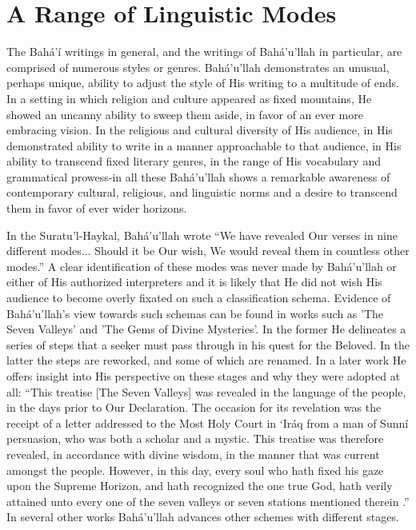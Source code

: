 \documentclass[12pt, oneside]{report}
\begin{document}
\section{A Range of Linguistic Modes}
\par
The Bah\'{a}'\'{i} writings in general, and the writings of Bah\'{a}'u'llah in particular, are comprised of numerous styles or genres. Bah\'{a}'u'llah demonstrates an unusual, perhaps unique, ability to adjust the style of His writing to a multitude of ends.
In a setting in which religion and culture appeared as fixed mountains, He showed an uncanny ability to sweep them aside, in favor of an ever more embracing vision.
In the religious and cultural diversity of His audience, in His demonstrated ability to write in a manner approachable to that audience, in His ability to transcend fixed literary genres, in the range of His vocabulary and grammatical prowess-in all these Bah\'{a}'u'llah shows a remarkable awareness of contemporary cultural, religious, and linguistic norms and a desire to transcend them in favor of ever wider horizons.
\par
In the Suratu'l-Haykal, Bah\'{a}'u'llah wrote ``We have revealed Our verses in nine different modes... Should it be Our wish, We would reveal them in countless other modes.''
A clear identification of these modes was never made by Bah\'{a}'u'llah or either of His authorized interpreters and it is likely that He did not wish His audience to become overly fixated on such a classification schema.
Evidence of Bah\'{a}'u'llah's view towards such schemas can be found in works such as 'The Seven Valleys' and 'The Gems of Divine Mysteries'.
In the former He delineates a series of steps that a seeker must pass through in his quest for the Beloved.
In the latter the steps are reworked, and some of which are renamed.
In a later work He offers insight into His perspective on these stages and why they were adopted at all: ``This treatise [The Seven Valleys] was revealed in the language of the people, in the days prior to Our Declaration. The occasion for its revelation was the receipt of a letter addressed to the Most Holy Court in ‘Iráq from a man of Sunní persuasion, who was both a scholar and a mystic. This treatise was therefore revealed, in accordance with divine wisdom, in the manner that was current amongst the people. However, in this day, every soul who hath fixed his gaze upon the Supreme Horizon, and hath recognized the one true God, hath verily attained unto every one of the seven valleys or seven stations mentioned therein \cite{}.''
In several other works Bah\'{a}'u'llah advances other schemes with different stages.
\end{document}
